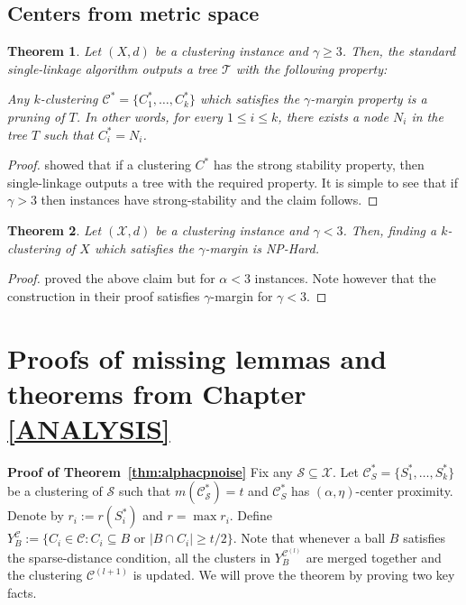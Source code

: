 \documentclass[letterpaper,12pt,titlepage,oneside,final]{book}
\newtheorem{theorem}{Theorem}
\newcommand{\mc}{\mathcal}
\begin{document}
\section{Centers from metric space}
\begin{theorem}
\label{thm:upperCenterMetric}
Let $(X , d)$ be a clustering instance and $\gamma \ge 3$. Then, the standard single-linkage algorithm outputs a tree $\mc T$ with the following property:


Any $k$-clustering $\mc C^* = \{C_1^*, \ldots, C_k^* \}$ which satisfies the $\gamma$-margin property is a pruning of $T$. In other words, for every $1 \le i \le k$, there exists a node $N_i$ in the tree $T$ such that $C_i^* = N_i$. 
\end{theorem}

\begin{proof}
\cite{balcan2008discriminative} showed that if a clustering $C^*$ has the strong stability property, then single-linkage outputs a tree with the required property. It is simple to see that if $\gamma > 3$ then instances have strong-stability and the claim follows.  
\end{proof}


\begin{theorem}
\label{thm:lowerCenterMetric}
Let $(\mc X, d)$ be a clustering instance and $\gamma < 3$. Then, finding a $k$-clustering of $X$ which satisfies the $\gamma$-margin is NP-Hard.
\end{theorem}
\begin{proof}
\cite{awasthi2012center} proved the above claim but for $\alpha < 3$ instances. Note however that the construction in their proof satisfies $\gamma$-margin for $\gamma < 3$. 
\end{proof}








\chapter{Proofs of missing lemmas and theorems from Chapter \ref{ANALYSIS}}
\textbf{Proof of Theorem~\ref{thm:alphacpnoise}}
Fix any $\mc S \subseteq \mc X$. Let $\mc C^*_S = \{S_1^*, \ldots, S_k^*\}$ be a clustering of $\mc S$ such that $m(\mc C_{\mc S}^*) = t$ and $\mc C^*_S$ has $(\alpha, \eta)$-center proximity. Denote by $r_i := r(S_i^*)$ and $r = \max r_i$. Define $Y_B^{\mc C} := \{C_i \in \mc C : C_i \subseteq B \text{ or } |B \cap C_i| \ge t/2\}$. Note that whenever a ball $B$ satisfies the sparse-distance condition, all the clusters in $Y_{B}^{{\mc C}^{(l)}}$ are merged together and the clustering $\mc C^{(l+1)}$ is updated. We will prove the theorem by proving two key facts.
\end{document}
